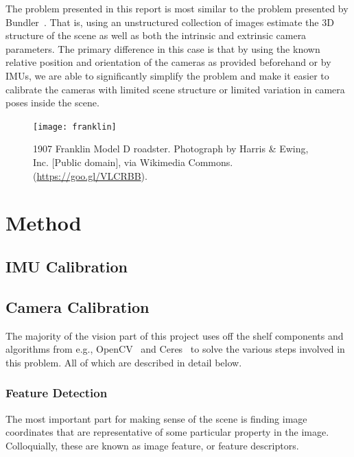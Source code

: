 \documentclass[acmtog]{acmart}
\begin{document}

The problem presented in this report is most similar to the problem presented by
Bundler~\cite{bundler2006}. That is, using an unstructured collection of images
estimate the 3D structure of the scene as well as both the intrinsic and
extrinsic camera parameters. The primary difference in this case is that by
using the known relative position and orientation of the cameras as provided
beforehand or by IMUs, we are able to significantly simplify the problem and
make it easier to calibrate the cameras with limited scene structure or limited
variation in camera poses inside the scene.



\begin{figure}[h]
  \centering
  \texttt{[image: franklin]}
  \caption{1907 Franklin Model D roadster. Photograph by Harris \& Ewing, Inc. [Public domain], via Wikimedia Commons. (\url{https://goo.gl/VLCRBB}).}
\end{figure}



\section{Method}

\subsection{IMU Calibration}

\subsection{Camera Calibration}

The majority of the vision part of this project uses off the shelf components
and algorithms from e.g., OpenCV~\cite{opencv_library} and
Ceres~\cite{ceres-solver} to solve the various steps involved in this
problem. All of which are described in detail below.

\subsubsection{Feature Detection}

The most important part for making sense of the scene is finding image
coordinates that are representative of some particular property in the
image. Colloquially, these are known as image feature, or feature descriptors.
\end{document}
